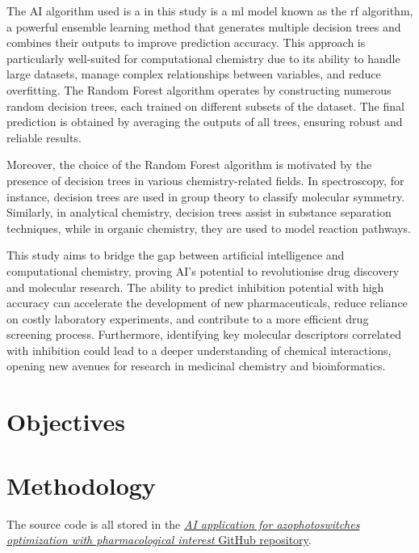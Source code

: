 \documentclass[11pt]{article}
\begin{document}
The AI algorithm used is a in this study is a \gls{ml} model known as the \gls{rf} algorithm\cite{MachineLearningRandomForest}, a powerful ensemble learning method that generates multiple decision trees and combines their outputs to improve prediction accuracy. This approach is particularly well-suited for computational chemistry due to its ability to handle large datasets, manage complex relationships between variables, and reduce overfitting. The Random Forest algorithm operates by constructing numerous random decision trees, each trained on different subsets of the dataset. The final prediction is obtained by averaging the outputs of all trees, ensuring robust and reliable results.

Moreover, the choice of the Random Forest algorithm is motivated by the presence of decision trees in various chemistry-related fields. In spectroscopy, for instance, decision trees are used in group theory to classify molecular symmetry. Similarly, in analytical chemistry, decision trees assist in substance separation techniques, while in organic chemistry, they are used to model reaction pathways.\par

This study aims to bridge the gap between artificial intelligence and computational chemistry, proving AI’s potential to revolutionise drug discovery and molecular research. The ability to predict inhibition potential with high accuracy can accelerate the development of new pharmaceuticals, reduce reliance on costly laboratory experiments, and contribute to a more efficient drug screening process. Furthermore, identifying key molecular descriptors correlated with inhibition could lead to a deeper understanding of chemical interactions, opening new avenues for research in medicinal chemistry and bioinformatics.
\newpage

\section{Objectives}

\newpage

\section{Methodology}
The source code is all stored in the \href{https://github.com/SirSergi0/Repository---AI-application-for-azophotoswitches-optimization-with-pharmacological-interest}{\emph{AI application for azophotoswitches optimization with pharmacological interest} GitHub repository}\cite{GitHub}.
\end{document}
